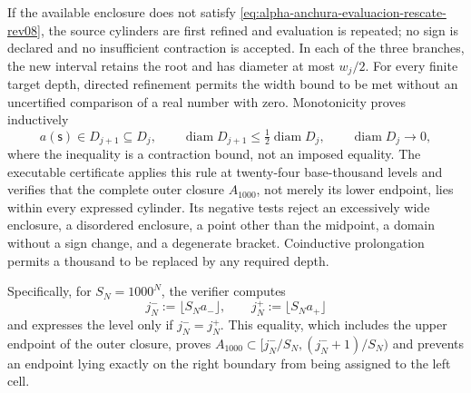 If the available enclosure does not satisfy
\eqref{eq:alpha-anchura-evaluacion-rescate-rev08}, the source cylinders are first
refined and evaluation is repeated; no sign is declared and no
insufficient contraction is accepted. In each of the three branches, the new
interval retains the root and has diameter at most \(w_j/2\). For every
finite target depth, directed refinement permits the width bound to be met
without an uncertified comparison of a real number with zero.
Monotonicity proves inductively
\begin{equation}
 a(\mathsf s)\in D_{j+1}\subseteq D_j,\qquad
 \operatorname{diam}D_{j+1}\leq
 \tfrac12\operatorname{diam}D_j,
 \qquad \operatorname{diam}D_j\longrightarrow0,
 \label{eq:alpha-biseccion-racional}
\end{equation}
where the inequality is a contraction bound, not an imposed equality.
The executable certificate applies
this rule at twenty-four base-thousand levels and verifies that the complete outer
closure \(A_{1000}\), not merely its lower endpoint, lies within
every expressed cylinder. Its negative tests reject an excessively wide
enclosure, a disordered enclosure, a point other than the midpoint, a domain without
a sign change, and a degenerate bracket. Coinductive prolongation permits
a thousand to be replaced by any required depth.

Specifically, for \(S_N=1000^N\), the verifier computes
\begin{equation}
 j_N^-:=\lfloor S_Na_-\rfloor,
 \qquad j_N^+:=\lfloor S_Na_+\rfloor
 \label{eq:alpha-indices-cilindro-dirigidos-rev08}
\end{equation}
and expresses the level only if \(j_N^-=j_N^+\). This equality, which includes the
upper endpoint of the outer closure, proves
\(A_{1000}\subset[j_N^-/S_N,(j_N^-+1)/S_N)\) and prevents an endpoint lying
exactly on the right boundary from being assigned to the left cell.

